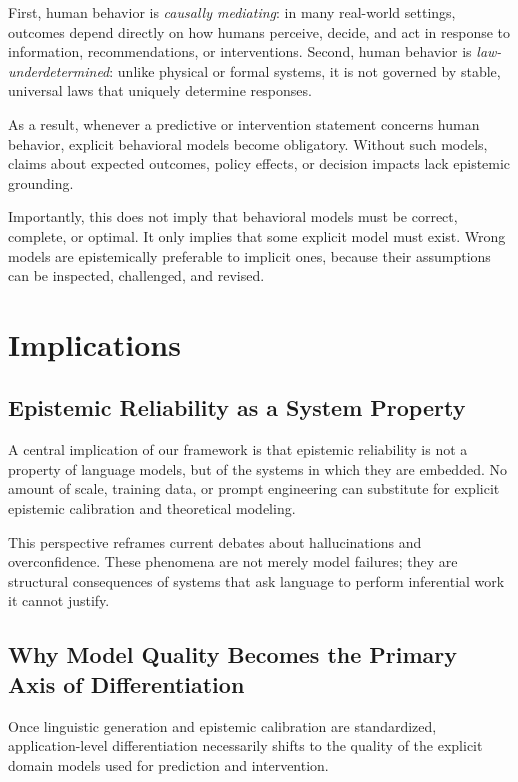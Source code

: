 \documentclass[11pt,a4paper]{article}
\begin{document}
First, human behavior is \emph{causally mediating}: in many real-world settings, outcomes depend directly on how humans perceive, decide, and act in response to information, recommendations, or interventions. Second, human behavior is \emph{law-underdetermined}: unlike physical or formal systems, it is not governed by stable, universal laws that uniquely determine responses.

As a result, whenever a predictive or intervention statement concerns human behavior, explicit behavioral models become obligatory. Without such models, claims about expected outcomes, policy effects, or decision impacts lack epistemic grounding.

Importantly, this does not imply that behavioral models must be correct, complete, or optimal. It only implies that some explicit model must exist. Wrong models are epistemically preferable to implicit ones, because their assumptions can be inspected, challenged, and revised.


\section{Implications}

\subsection{Epistemic Reliability as a System Property}

A central implication of our framework is that epistemic reliability is not a property of language models, but of the systems in which they are embedded. No amount of scale, training data, or prompt engineering can substitute for explicit epistemic calibration and theoretical modeling.

This perspective reframes current debates about hallucinations and overconfidence. These phenomena are not merely model failures; they are structural consequences of systems that ask language to perform inferential work it cannot justify.

\subsection{Why Model Quality Becomes the Primary Axis of Differentiation}

Once linguistic generation and epistemic calibration are standardized, application-level differentiation necessarily shifts to the quality of the explicit domain models used for prediction and intervention.
\end{document}
